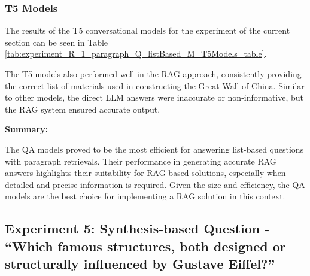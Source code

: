 \documentclass{wseas}
\begin{document}
\subsubsection{T5 Models}


The results of the T5 conversational models for the experiment of the
current section can be seen in Table \ref{tab:experiment_R_1_paragraph_Q_listBased_M_T5Models_table}.

The T5 models also performed well in the RAG approach, consistently
providing the correct list of materials used in constructing the Great
Wall of China. Similar to other models, the direct LLM answers were
inaccurate or non-informative, but the RAG system ensured accurate
output.

\textbf{Summary:}


The QA models proved to be the most efficient for answering list-based
questions with paragraph retrievals. Their performance in generating
accurate RAG answers highlights their suitability for RAG-based
solutions, especially when detailed and precise information is required.
Given the size and efficiency, the QA models are the best choice for
implementing a RAG solution in this context.


\subsection{Experiment 5: Synthesis-based Question - ``Which famous
structures, both designed or structurally influenced by Gustave
Eiffel?''}
\end{document}
